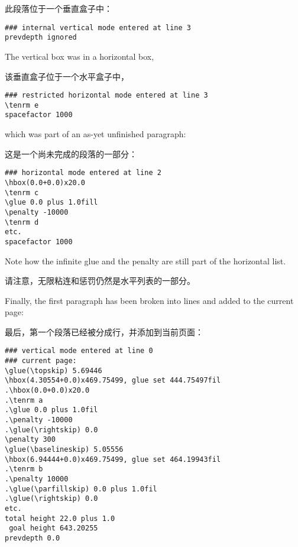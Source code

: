 此段落位于一个垂直盒子中：
\begin{verbatim}
### internal vertical mode entered at line 3
prevdepth ignored
\end{verbatim}
The vertical box was in  a horizontal box, 

该垂直盒子位于一个水平盒子中，
\begin{verbatim}
### restricted horizontal mode entered at line 3
\tenrm e
spacefactor 1000
\end{verbatim}
\awp
which was part of
an as-yet unfinished paragraph:

这是一个尚未完成的段落的一部分：\begin{verbatim}
### horizontal mode entered at line 2
\hbox(0.0+0.0)x20.0
\tenrm c
\glue 0.0 plus 1.0fill
\penalty -10000
\tenrm d
etc.
spacefactor 1000
\end{verbatim}
Note how the infinite glue and the  penalty
are still part of the horizontal list.

请注意，无限粘连和惩罚仍然是水平列表的一部分。

Finally, the first paragraph has been broken into lines and 
added to the current page:

最后，第一个段落已经被分成行，并添加到当前页面：\begin{verbatim}
### vertical mode entered at line 0
### current page:
\glue(\topskip) 5.69446
\hbox(4.30554+0.0)x469.75499, glue set 444.75497fil
.\hbox(0.0+0.0)x20.0
.\tenrm a
.\glue 0.0 plus 1.0fil
.\penalty -10000
.\glue(\rightskip) 0.0
\penalty 300
\glue(\baselineskip) 5.05556
\hbox(6.94444+0.0)x469.75499, glue set 464.19943fil
.\tenrm b
.\penalty 10000
.\glue(\parfillskip) 0.0 plus 1.0fil
.\glue(\rightskip) 0.0
etc.
total height 22.0 plus 1.0
 goal height 643.20255
prevdepth 0.0
\end{verbatim}



